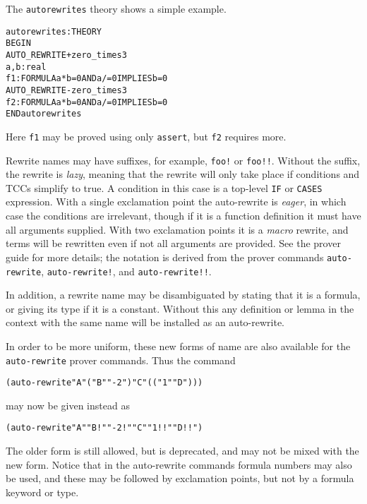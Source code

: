 The \texttt{autorewrites} theory shows a simple example.
\begin{alltt}
autorewrites: THEORY
BEGIN
 AUTO_REWRITE+ zero_times3
 a, b: real
 f1: FORMULA a * b = 0 AND a /= 0 IMPLIES b = 0
 AUTO_REWRITE- zero_times3
 f2: FORMULA a * b = 0 AND a /= 0 IMPLIES b = 0
END autorewrites
\end{alltt}
Here \texttt{f1} may be proved using only \texttt{assert}, but \texttt{f2}
requires more.

Rewrite names may have suffixes, for example, \texttt{foo!} or
\texttt{foo!!}.  Without the suffix, the rewrite is \emph{lazy}, meaning
that the rewrite will only take place if conditions and TCCs simplify to
true.  A condition in this case is a top-level \texttt{IF} or
\texttt{CASES} expression.  With a single exclamation point the
auto-rewrite is \emph{eager}, in which case the conditions are irrelevant,
though if it is a function definition it must have all arguments supplied.
With two exclamation points it is a \emph{macro} rewrite, and terms will
be rewritten even if not all arguments are provided.  See the prover guide
for more details; the notation is derived from the prover commands
\texttt{auto-rewrite}, \texttt{auto-rewrite!}, and
\texttt{auto-rewrite!!}.

In addition, a rewrite name may be disambiguated by stating that it is a
formula, or giving its type if it is a constant.  Without this any
definition or lemma in the context with the same name will be installed as
an auto-rewrite.

In order to be more uniform, these new forms of name are also available
for the \texttt{auto-rewrite} prover commands.  Thus the command
\begin{alltt}
  (auto-rewrite "A" ("B" "-2") "C" (("1" "D")))
\end{alltt}
may now be given instead as
\begin{alltt}
  (auto-rewrite "A" "B!" "-2!" "C" "1!!" "D!!")
\end{alltt}
The older form is still allowed, but is deprecated, and may not be mixed
with the new form.  Notice that in the auto-rewrite commands formula
numbers may also be used, and these may be followed by exclamation points,
but not by a formula keyword or type.

